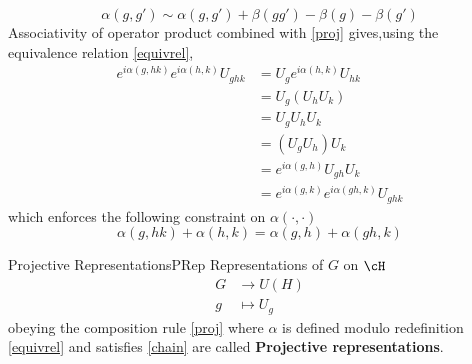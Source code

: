 \documentclass[11pt]{article}
\theoremstyle{definition}
\numberwithin{equation}{section}
\begin{document}
\begin{equation}\label{equivrel}
    \alpha(g,g') \sim \alpha(g,g') +\beta(gg') -\beta(g) - \beta(g')
\end{equation} 
Associativity of operator product combined with \eqref{proj} gives,using the equivalence relation \eqref{equivrel}, 
\begin{equation}
\begin{aligned}
    e^{i \alpha(g,hk)} e^{i \alpha(h,k)} U_{ghk}&=  U_g e^{i \alpha(h,k) } U_{hk}\\&= U_g (U_h U_k)\\
    &= U_{g} U_h U_k \\
    &= (U_g U_h) U_k\\
    &= e^{i \alpha(g,h)} U_{gh} U_k \\
    &= e^{i \alpha(g,k)} e^{i \alpha(gh,k)} U_{ghk}
    \end{aligned}
\end{equation}
which enforces the following constraint on $\alpha(\cdot, \cdot)$
\begin{equation}\label{chain}
    \alpha(g,hk) + \alpha(h,k) = \alpha(g,h) + \alpha(gh,k)
\end{equation}

\begin{defn}{Projective Representations}{PRep}
Representations of $G$ on $\cH$
    \begin{equation}
        \begin{aligned}
            G &\to U(H)\\
            g &\mapsto U_g
        \end{aligned}
    \end{equation}
obeying the composition rule \eqref{proj} where $\alpha$ is defined modulo redefinition \eqref{equivrel} and satisfies \eqref{chain} are called \textbf{Projective representations}.
\end{defn}
\end{document}
